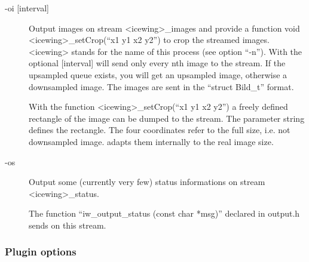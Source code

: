 \begin{description}
\begin{description}
 \end{description}

\item[-oi [interval{]}]
  Output images on \dacs{} stream
  \textless{}icewing\textgreater{}\_images and provide a function
  void \textless{}icewing\textgreater{}\_setCrop(``x1 y1 x2 y2'') to
  crop the streamed images. \textless{}icewing\textgreater{} stands
  for the \dacs{} name of this \icewing{} process (see option
  ``-n''). With the optional [interval] \icewing{} will send
  only every nth image to the stream. If the upsampled queue exists,
  you will get an upsampled image, otherwise a downsampled
  image. The images are sent in the ``struct Bild\_t'' format.

  With the function \textless{}icewing\textgreater{}\_setCrop(``x1 y1 x2 y2'')
  a freely defined rectangle of the image can be dumped to the
  stream. The parameter string defines the rectangle. The four
  coordinates refer to the full size, i.e. not downsampled
  image. \icewing{} adapts them internally to the real image size.

\item[-os]
  Output some (currently very few) status informations on \dacs{}
  stream \textless{}icewing\textgreater{}\_status.

  The function ``iw\_output\_status (const char *msg)'' declared in
  output.h sends on this stream.

\end{description}

\subsubsection {Plugin options}

